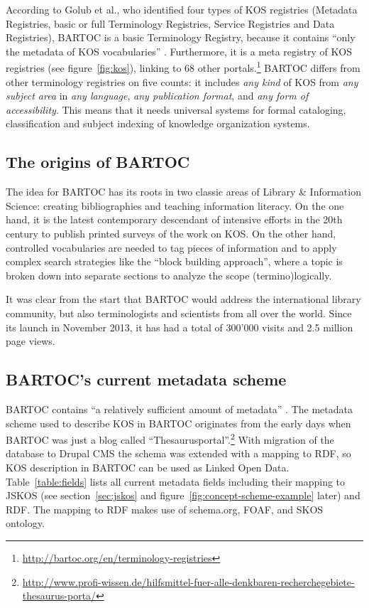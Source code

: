 \documentclass[12pt,a4paper]{llncs}
\begin{document}
According to Golub et al., who identified four types of KOS registries (Metadata Registries, basic or full Terminology Registries, Service Registries and Data Registries), BARTOC is a basic Terminology Registry, because it contains ``only the metadata of KOS vocabularies'' \cite[1903]{golub2014terminology}. Furthermore, it is a meta registry of KOS registries (see figure~\ref{fig:kos}), linking to 68 other portals.\footnote{\href{http://bartoc.org/en/terminology-registries}{http://bartoc.org/en/terminology-registries}} BARTOC differs from other terminology registries on five counts: it includes \textit{any kind} of KOS from \textit{any subject area} in \textit{any language}, \textit{any publication format}, and \textit{any form of accessibility}. This means that it needs universal systems for formal cataloging, classification and subject indexing of knowledge organization systems.

\subsection{The origins of BARTOC}
The idea for BARTOC has its roots in two classic areas of Library \& Information Science: creating bibliographies and teaching information literacy. On the one hand, it is the latest contemporary descendant of intensive efforts in the 20th century to publish printed surveys of the work on KOS. On the other hand, controlled vocabularies are needed to tag pieces of information and to apply complex search strategies like the ``block building approach'', where a topic is broken down into separate sections to analyze the scope (termino)logically.

It was clear from the start that BARTOC would address the international library community, but also terminologists and scientists from all over the world. Since its launch in November 2013, it has had a total of 300'000 visits and 2.5 million page views.

\subsection{BARTOC's current metadata scheme}
\label{sec:scheme}

BARTOC contains ``a relatively sufficient amount of metadata'' \cite{bratkova2014revue}. The metadata scheme used to describe KOS in BARTOC originates from the early days when BARTOC was just a blog called ``Thesaurusportal''.\footnote{\href{http://www.profi-wissen.de/hilfsmittel-fuer-alle-denkbaren-recherchegebiete-thesaurus-porta/}{http://www.profi-wissen.de/hilfsmittel-fuer-alle-denkbaren-recherchegebiete-thesaurus-porta/}} With migration of the database to Drupal CMS the schema was extended with a mapping to RDF, so KOS description in BARTOC can be used as Linked Open Data. Table~\ref{table:fields} lists all current metadata fields including their mapping to JSKOS (see section~\ref{sec:jskos} and figure~\ref{fig:concept-scheme-example} later) and RDF. The mapping to RDF makes use of schema.org, FOAF, and SKOS ontology.
\end{document}
